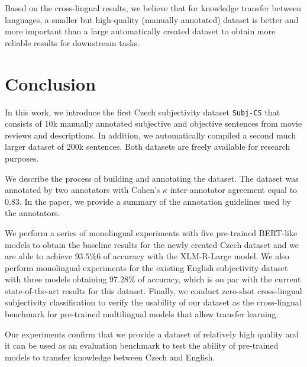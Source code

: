 \documentclass[10pt, a4paper]{article}
\begin{document}
\par Based on the cross-lingual results, we believe that for knowledge transfer between languages, a smaller but high-quality (manually annotated) dataset is better and more important than a large automatically created dataset to obtain more reliable results for downstream tasks. 





















\section{Conclusion}
In this work, we introduce the first Czech subjectivity dataset \texttt{Subj-CS} that consists of 10k manually annotated subjective and objective sentences from movie reviews and descriptions.
In addition, we automatically compiled a second much larger dataset of 200k sentences. Both datasets are freely available for research purposes.

\par We describe the process of building and annotating the dataset. The dataset was annotated by two annotators with Cohen’s $\kappa$ inter-annotator agreement equal to $0.83$. In the paper, we provide a summary of the annotation guidelines used by the annotators.

\par We perform a series of monolingual experiments with five pre-trained BERT-like models to obtain the baseline results for the newly created Czech dataset and we are able to achieve $93.5\%6$ of accuracy with the XLM-R-Large model. We also perform monolingual experiments for the existing English subjectivity dataset with three models obtaining $97.28\%$ of accuracy, which is on par with the current state-of-the-art results for this dataset. Finally, we conduct zero-shot cross-lingual subjectivity classification to verify the usability of our dataset as the cross-lingual benchmark for pre-trained multilingual models that allow transfer learning. 

\par Our experiments confirm that we provide a dataset of relatively high quality and it can be used as an evaluation benchmark to test the ability of pre-trained models to transfer knowledge between Czech and English.
\end{document}

